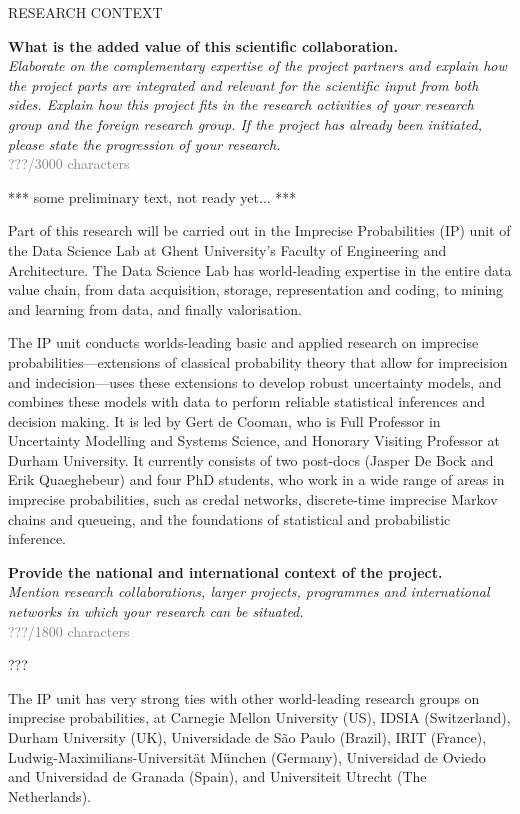 \documentclass[11pt,dvipsnames,usenames,a4paper]{article}
\begin{document}
\vspace{5mm}

\begin{shaded}\centering RESEARCH CONTEXT \end{shaded}
\textbf{What is the added value of this scientific collaboration.}\\
\textit{Elaborate on the complementary expertise of the project partners and explain how the project parts are integrated and relevant for the scientific input from both sides. Explain how this project fits in the research activities of your research group and the foreign research group. If the project has already been initiated, please state the progression of your research.}\\
\textcolor{Gray}{???/3000 characters}

*** some preliminary text, not ready yet... ***

Part of this research will be carried out in the Imprecise Probabilities (IP) unit of the Data Science Lab at Ghent University's Faculty of Engineering and Architecture.
The Data Science Lab has world-leading expertise in the entire data value chain, from data acquisition, storage, representation and coding, to mining and learning from data, and finally valorisation. 

The IP unit conducts worlds-leading basic and applied research on imprecise probabilities---extensions of classical probability theory that allow for imprecision and indecision---uses these extensions to develop robust uncertainty models, and combines these models with data to perform reliable statistical inferences and decision making.
It is led by Gert de Cooman, who is Full Professor in Uncertainty Modelling and Systems Science, and Honorary Visiting Professor at Durham University.
It currently consists of two post-docs (Jasper De Bock and Erik Quaeghebeur) and four PhD students, who work in a wide range of areas in imprecise probabilities, such as credal networks, discrete-time imprecise Markov chains and queueing, and the foundations of statistical and probabilistic inference.  


\textbf{Provide the national and international context of the project.}\\
\textit{Mention research collaborations, larger projects, programmes and international networks in which your research can be situated.}\\
\textcolor{Gray}{???/1800 characters}

???


The IP unit has very strong ties with other world-leading research groups on imprecise probabilities, at Carnegie Mellon University (US), IDSIA (Switzerland), Durham University (UK), Universidade de S\~ao Paulo (Brazil), IRIT (France), Ludwig-Maximilians-Universit\"at M\"unchen (Germany), Universidad de Oviedo and Universidad de Granada (Spain), and Universiteit Utrecht (The Netherlands).
\end{document}
